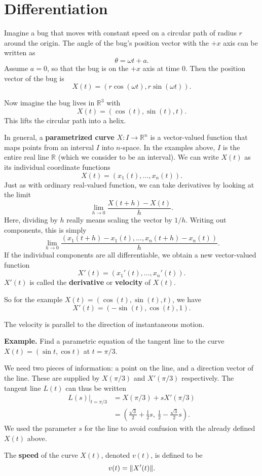 \documentclass{article}
\begin{document}



\section*{Differentiation}

Imagine a bug that moves with constant speed on a circular path of 
radius $r$ around the origin.
The angle of the bug's position vector with the $+x$ axis can
be written as 
\[\theta = \omega t + a.\]
Assume $a=0$, so that the bug is on the $+x$ axis at time $0$.
Then the position vector of the bug is 
\[X(t) = (r \cos (\omega t), r \sin(\omega t)).\]

Now imagine the bug lives in $\mathbb{R}^3$ with
\[X(t) = (\cos(t), \sin(t), t).\]
This lifts the circular path into a helix.

In general, a \textbf{parametrized curve} $X : I \to \mathbb{R}^n$ is a vector-valued function
that maps points from an interval $I$ into $n$-space. In the examples above,
$I$ is the entire real line $\mathbb{R}$ (which we consider to be an interval). 
We can write $X(t)$ as its individual coordinate functions
\[X(t) = (x_1(t), \ldots, x_n(t)).\]
Just as with ordinary real-valued function, we can take derivatives by 
looking at the limit
\[\lim_{h \to 0} \frac{X(t+h)-X(t)}{h}.\]
Here, dividing by $h$ really means scaling the vector by $1/h$. Writing out components, this is simply
\[\lim_{h \to 0} \frac{(x_1(t+h)-x_1(t), \ldots, x_n(t+h)-x_n(t))}{h}.\]
If the individual components are all differentiable, we obtain a
new vector-valued function
\[X'(t) = (x_1'(t), \ldots, x_n'(t)).\]
$X'(t)$ is called the \textbf{derivative} or \textbf{velocity} of $X(t)$. 

So for the example $X(t) = (\cos(t), \sin(t), t)$, we have
\[X'(t) = (-\sin(t), \cos(t), 1).\]

The velocity is parallel to the direction of instantaneous motion.


\textbf{Example.} 
Find a parametric equation of the tangent line to the curve $X(t) = (\sin t, \cos t)$
at $t=\pi/3$. 

We need two pieces of information: a point on the line, and a direction vector of the line.
These are supplied by $X(\pi/3)$ and $X'(\pi/3)$ respectively. The tangent line $L(t)$ can thus be 
written 
\begin{align*}
    L(s) |_{t=\pi/3} &= X(\pi/3) + sX'(\pi/3)  \\
    &= \left( \frac{\sqrt{3}}{2} + \frac{1}{2}s,\ \frac{1}{2} - \frac{\sqrt{3}}{2}s \right).
\end{align*}
We used the parameter $s$ for the line to avoid confusion with the already defined $X(t)$ above.

The \textbf{speed} of the curve $X(t)$, denoted $v(t)$, is defined to be 
\[v(t) = \norm{X'(t)}.\]


\end{document}
